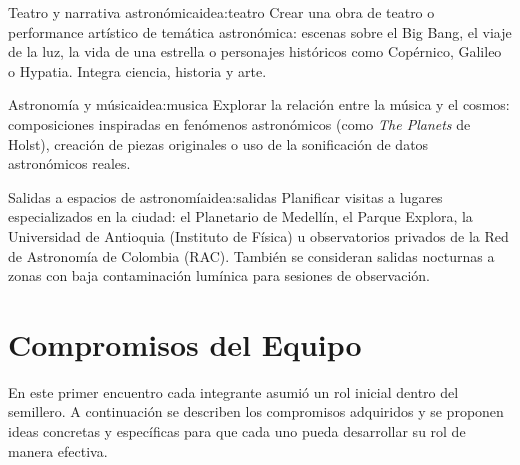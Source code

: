 \begin{idea}{Teatro y narrativa astronómica}{idea:teatro}
    Crear una obra de teatro o performance artístico de temática astronómica: escenas
    sobre el Big Bang, el viaje de la luz, la vida de una estrella o personajes
    históricos como Copérnico, Galileo o Hypatia. Integra ciencia, historia y arte.
\end{idea}

\begin{idea}{Astronomía y música}{idea:musica}
    Explorar la relación entre la música y el cosmos: composiciones inspiradas en
    fenómenos astronómicos (como \textit{The Planets} de Holst), creación de piezas
    originales o uso de la sonificación de datos astronómicos reales.
\end{idea}

\begin{idea}{Salidas a espacios de astronomía}{idea:salidas}
    Planificar visitas a lugares especializados en la ciudad: el Planetario de Medellín,
    el Parque Explora, la Universidad de Antioquia (Instituto de Física) u observatorios
    privados de la Red de Astronomía de Colombia (RAC). También se consideran salidas
    nocturnas a zonas con baja contaminación lumínica para sesiones de observación.
\end{idea}

\section{Compromisos del Equipo}

En este primer encuentro cada integrante asumió un rol inicial dentro del semillero.
A continuación se describen los compromisos adquiridos y se proponen ideas concretas
y específicas para que cada uno pueda desarrollar su rol de manera efectiva.

